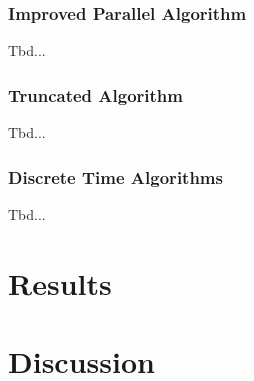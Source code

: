 \documentclass{uwstat572}
\begin{document}
\subsubsection{Improved Parallel Algorithm}
Tbd...

\subsubsection{Truncated Algorithm}
Tbd...

\subsubsection{Discrete Time Algorithms}
Tbd...

\section{Results}

\section{Discussion}


\end{document}
